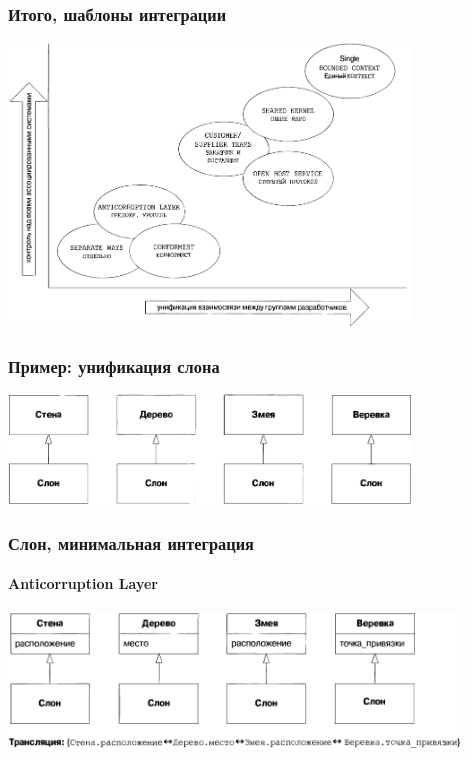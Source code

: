 \documentclass[xetex,mathserif,serif]{beamer}
\begin{document}
	\begin{frame}
		\frametitle{Итого, шаблоны интеграции}
		\begin{center}
			\includegraphics[width=0.8\textwidth]{integrationPatterns.png}
		\end{center}
	\end{frame}

	\begin{frame}
		\frametitle{Пример: унификация слона}
		\begin{center}
			\includegraphics[width=0.8\textwidth]{elephantSeparateWays.png}
		\end{center}
	\end{frame}

	\begin{frame}
		\frametitle{Слон, минимальная интеграция}
		\framesubtitle{Anticorruption Layer}
		\begin{center}
			\includegraphics[width=0.9\textwidth]{elephantAnticorruptionLayer.png}
		\end{center}
	\end{frame}
\end{document}
